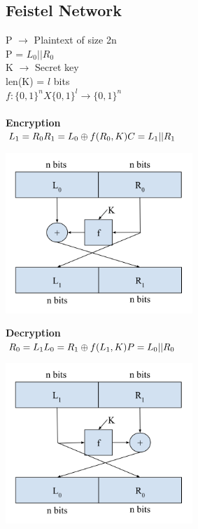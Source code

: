\documentclass[11pt]{article}
\begin{document}
\subsection*{Feistel Network}
P $ \rightarrow $ Plaintext of size 2n \\
P = $L_0 || R_0$ \\
K $ \rightarrow $ Secret key \\
len(K) = $l$ bits \\
$ f : \{0,1\}^n X \{0,1\}^l \rightarrow \{0,1\}^n $
\\ \\
\textbf{Encryption} \\
$
L_1 = R_0 \\
R_1 = L_0 \oplus f(R_0,K) \\
C = L_1 || R_1 \\
$
\begin{center}
\includegraphics[width=200pt]{p3.png}
\end{center}
\textbf{Decryption} \\
$
R_0 = L_1 \\
L_0 = R_1 \oplus f(L_1,K) \\
P = L_0 || R_0 \\
$
\begin{center}
\includegraphics[width=200pt]{p4.png}
\end{center}
\end{document}
